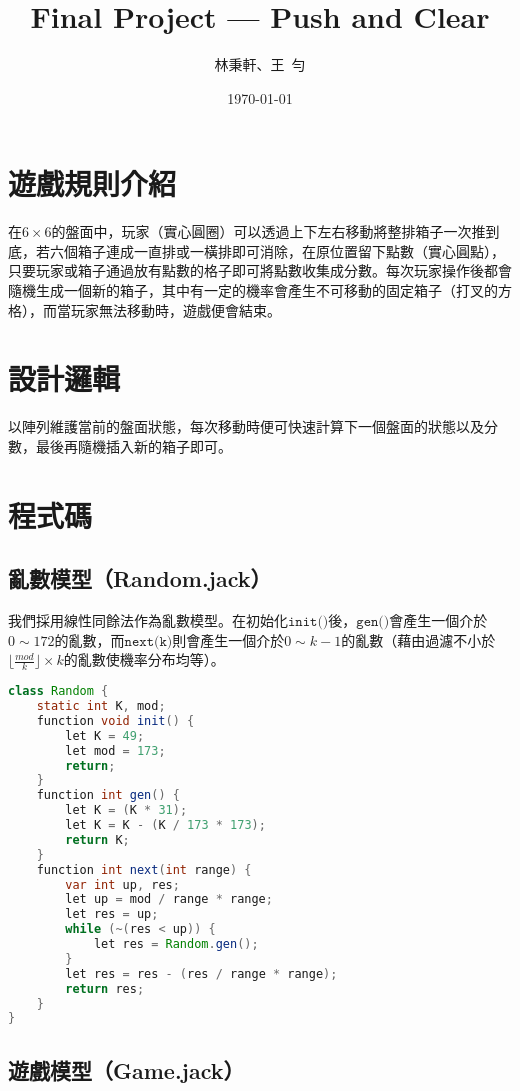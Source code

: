 \documentclass[pstricks, 12pt, a4paper]{article}
\title{Final Project --- Push and Clear}
\author{林秉軒、王\ 勻}
\date{\today}
\begin{document}
\maketitle

\thispagestyle{std}


\section{遊戲規則介紹}
在$6\times 6$的盤面中，玩家（實心圓圈）可以透過上下左右移動將整排箱子一次推到底，若六個箱子連成一直排或一橫排即可消除，在原位置留下點數（實心圓點），只要玩家或箱子通過放有點數的格子即可將點數收集成分數。每次玩家操作後都會隨機生成一個新的箱子，其中有一定的機率會產生不可移動的固定箱子（打叉的方格），而當玩家無法移動時，遊戲便會結束。

\section{設計邏輯}
以陣列維護當前的盤面狀態，每次移動時便可快速計算下一個盤面的狀態以及分數，最後再隨機插入新的箱子即可。

\section{程式碼}
  \subsection{亂數模型（Random.jack）}
    我們採用線性同餘法作為亂數模型。在初始化$\texttt{init()}$後，$\texttt{gen()}$會產生一個介於$0\sim 172$的亂數，而$\texttt{next(k)}$則會產生一個介於$0\sim k-1$的亂數（藉由過濾不小於$\lfloor \frac{mod}{k}\rfloor\times k$的亂數使機率分布均等）。
    \begin{lstlisting}[language=Java, frame=single]
class Random {
    static int K, mod;
    function void init() {
        let K = 49;
        let mod = 173;
        return;
    }
    function int gen() {
        let K = (K * 31);
        let K = K - (K / 173 * 173);
        return K;
    }
    function int next(int range) {
        var int up, res;
        let up = mod / range * range;
        let res = up;
        while (~(res < up)) {
            let res = Random.gen();
        }
        let res = res - (res / range * range);
        return res;
    }
}
    \end{lstlisting}

  \subsection{遊戲模型（Game.jack）}
\end{document}
